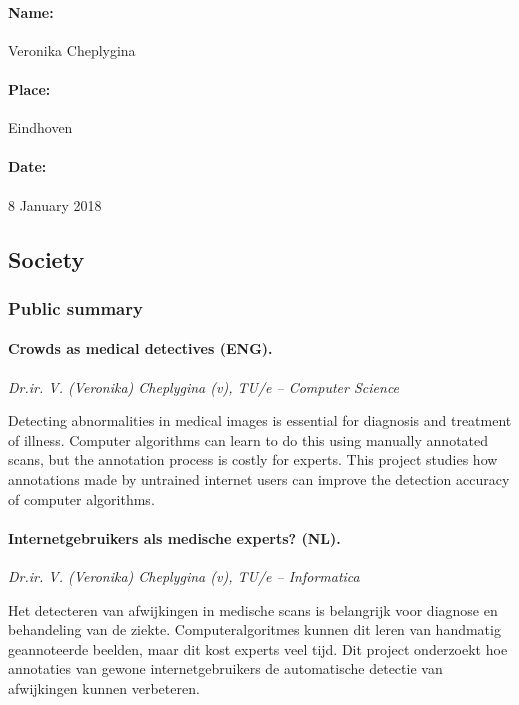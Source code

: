 \documentclass[serif, twocolumn, numeric, rga]{jote-article}
\begin{document}
\noindent\paragraph{Name:} Veronika Cheplygina

\noindent\paragraph{Place:} Eindhoven

\noindent\paragraph{Date:} 8 January 2018

\subsection*{Society}

\subsubsection*{Public summary}

\paragraph{Crowds as medical detectives (ENG).} 

\noindent\emph{Dr.ir. V. (Veronika) Cheplygina (v), TU/e -- Computer Science}

Detecting abnormalities in medical images is essential for diagnosis and treatment of illness. Computer algorithms can learn to do this using manually annotated scans, but the annotation process is costly for experts. This project studies how annotations made by untrained internet users can improve the detection accuracy of computer algorithms.

\paragraph{Internetgebruikers als medische experts? (NL).} 

\noindent\emph{Dr.ir. V. (Veronika) Cheplygina (v), TU/e -- Informatica}

Het detecteren van afwijkingen in medische scans is belangrijk voor diagnose en behandeling van de ziekte. Computeralgoritmes kunnen dit leren van handmatig geannoteerde beelden, maar dit kost experts veel tijd. Dit project onderzoekt hoe annotaties van gewone internetgebruikers de automatische detectie van afwijkingen kunnen verbeteren.
\end{document}
